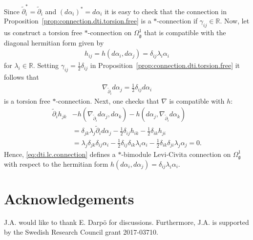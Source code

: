 \documentclass{amsart}
\newcommand{\reals}{\mathbb{R}}
\theoremstyle{definition}
\theoremstyle{remark}
\numberwithin{equation}{section}
\renewcommand{\d}{\partial}
\newcommand{\dt}{\tilde{\d}}
\newcommand{\g}{\mathfrak{g}}
\newcommand{\Omegaoneg}{\Omega^1_{\g}}
\begin{document}
\noindent
Since $\dt_i^\ast=\dt_i$ and $(d\alpha_i)^\ast=d\alpha_i$ it is easy
to check that the connection in
Proposition~\ref{prop:connection.dti.torsion.free} is a
$\ast$-connection if $\gamma_{ij}\in\reals$.  Now, let us construct a
torsion free $\ast$-connection on $\Omegaoneg$ that is compatible with
the diagonal hermitian form given by
\begin{align*}
  h_{ij}=h(d\alpha_i,d\alpha_j)=\delta_{ij}\lambda_i\alpha_i 
\end{align*}
for $\lambda_i\in\reals$. Setting $\gamma_{ij}=\tfrac{1}{2}\delta_{ij}$ in
Proposition~\ref{prop:connection.dti.torsion.free} it follows that
\begin{align}\label{eq:dti.lc.connection}
  \nabla_{\dt_i}d\alpha_j = \tfrac{1}{2}\delta_{ij}d\alpha_i
\end{align}
is a torsion free $\ast$-connection. Next, one checks that $\nabla$ is
compatible with $h$:
\begin{align*}
  \dt_ih_{jk}
  &- h(\nabla_{\dt_i}d\alpha_j,d\alpha_k)-h(d\alpha_j,\nabla_{\dt_i}d\alpha_k)\\
  & = \delta_{jk}\lambda_j\dt_id\alpha_j
    - \tfrac{1}{2}\delta_{ij}h_{ik} - \tfrac{1}{2}\delta_{ik}h_{ji}\\
  &= \lambda_j\delta_{jk}\delta_{ij}\alpha_i
    - \tfrac{1}{2}\delta_{ij}\delta_{ik}\lambda_i\alpha_i
    - \tfrac{1}{2}\delta_{ik}\delta_{ji}\lambda_j\alpha_j = 0.
\end{align*}
Hence, \eqref{eq:dti.lc.connection} defines a $\ast$-bimodule Levi-Civita connection
on $\Omegaoneg$ with respect to the hermitian form
$h(d\alpha_i,d\alpha_j)=\delta_{ij}\lambda_i\alpha_i$.

\section*{Acknowledgements}
J.A. would like to thank E. Darp\"o for discussions. Furthermore,
J.A. is supported by the Swedish Research Council grant 2017-03710.



  
\end{document}
